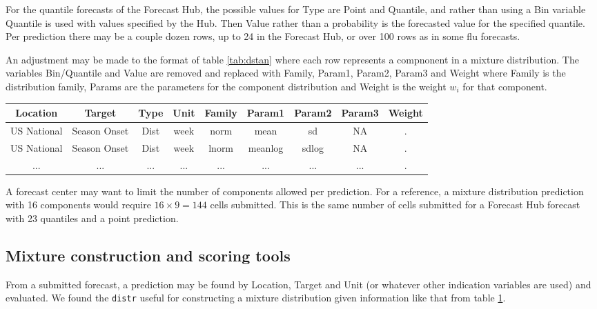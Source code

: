 \documentclass{article}\usepackage[]{graphicx}\usepackage[]{color}
\begin{document}
For the quantile forecasts of the Forecast Hub, the possible values for Type 
are Point and Quantile, and rather than using a Bin variable Quantile is used
with values specified by the Hub. Then Value rather than a probability is the
forecasted value for the specified quantile. Per prediction there may be a 
couple dozen rows, up to 24 in the Forecast Hub, or over 100 rows as in some
flu forecasts. 

An adjustment may be made to the format of table \ref{tab:dstan} where each row
represents a compnonent in a mixture distribution.
The variables Bin/Quantile and Value are removed and replaced with Family,
Param1, Param2, Param3 and Weight where Family is the distribution family,
Params are the parameters for the component distribution and Weight is the 
weight $w_i$ for that component.

\begin{table}[h!]
\label{tab:mstan}
\centering
 \begin{tabular}{|c|c|c|c|c|c|c|c|c|}
 \hline
    Location & Target & Type & Unit & Family & Param1 & Param2 & Param3 & Weight
    \\ \hline
    US National & Season Onset & Dist & week & norm & mean & sd & NA & .  \\
    US National & Season Onset & Dist & week & lnorm & meanlog & sdlog & NA & . \\
    ... & ... & ... & ... & ... & ... & ... & ... & .\\
 \hline
 \end{tabular}
\end{table}

A forecast center may want to limit the number of components allowed per 
prediction. For a reference, a mixture distribution prediction with 16 
components would require $16 \times 9 = 144$ cells submitted. This is the same 
number of cells
submitted for a Forecast Hub forecast with 23 quantiles and a point prediction.

\subsection{Mixture construction and scoring tools}

From a submitted forecast, a prediction may be found by Location, Target and 
Unit (or whatever other indication variables are used) and evaluated. We found
the \texttt{distr} \cite{camphausen2007distr}
useful for constructing a mixture distribution given
information like that from table \ref{tab:mstan}. 
\end{document}

